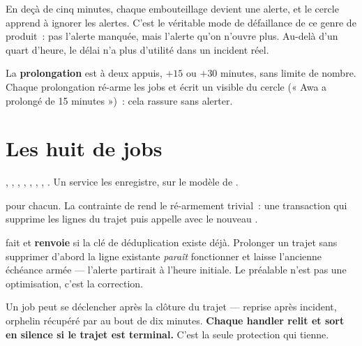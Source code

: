 \begin{note}
En deçà de cinq minutes, chaque embouteillage devient une alerte, et le cercle apprend à
ignorer les alertes. C'est le véritable mode de défaillance de ce genre de produit~: pas
l'alerte manquée, mais l'alerte qu'on n'ouvre plus. Au-delà d'un quart d'heure, le délai
n'a plus d'utilité dans un incident réel.
\end{note}

La \textbf{prolongation} est à deux appuis, $+15$ ou $+30$ minutes, sans limite de nombre.
Chaque prolongation ré-arme les jobs et écrit un  visible du cercle
(« Awa a prolongé de 15 minutes »)~: cela rassure sans alerter.

\section{Les huit  de jobs}

, , ,
, , ,
, . Un service
 les enregistre, sur le modèle de
.

 pour chacun. La contrainte
 de 
rend le ré-armement trivial~: une transaction qui supprime les lignes du trajet puis
appelle  avec le nouveau .

\begin{alerte}
 fait  et \textbf{renvoie }
si la clé de déduplication existe déjà. Prolonger un trajet sans supprimer d'abord la ligne
existante \emph{paraît} fonctionner et laisse l'ancienne échéance armée --- l'alerte
partirait à l'heure initiale. Le  préalable n'est pas une optimisation, c'est
la correction.
\end{alerte}

\begin{note}
Un job peut se déclencher après la clôture du trajet --- reprise après incident, orphelin
récupéré par  au bout de dix minutes. \textbf{Chaque handler relit
 et sort en silence si le trajet est terminal.} C'est la seule protection
qui tienne.
\end{note}

